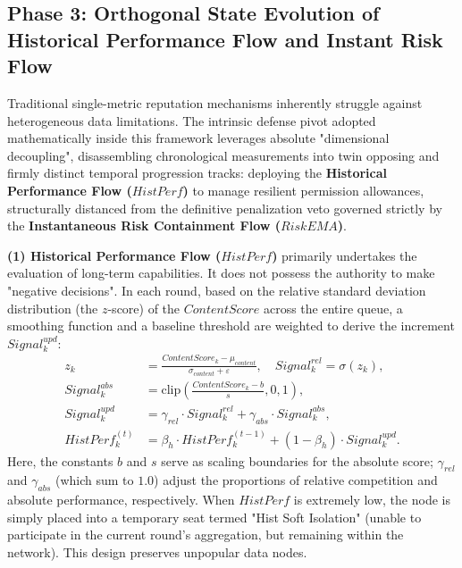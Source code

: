 \documentclass[runningheads]{llncs}
\begin{document}
\subsection{Phase 3: Orthogonal State Evolution of Historical Performance Flow and Instant Risk Flow}
Traditional single-metric reputation mechanisms inherently struggle against heterogeneous data limitations. The intrinsic defense pivot adopted mathematically inside this framework leverages absolute "dimensional decoupling", disassembling chronological measurements into twin opposing and firmly distinct temporal progression tracks: deploying the \textbf{Historical Performance Flow ($HistPerf$)} to manage resilient permission allowances, structurally distanced from the definitive penalization veto governed strictly by the \textbf{Instantaneous Risk Containment Flow ($RiskEMA$)}.

\textbf{(1) Historical Performance Flow ($HistPerf$)} primarily undertakes the evaluation of long-term capabilities. It does not possess the authority to make "negative decisions". In each round, based on the relative standard deviation distribution (the $z$-score) of the $ContentScore$ across the entire queue, a smoothing function and a baseline threshold are weighted to derive the increment $Signal_k^{upd}$:
\begin{align}
    z_{k} &= \frac{ContentScore_{k} - \mu_{content}}{\sigma_{content} + \varepsilon}, \quad Signal_{k}^{rel} = \sigma(z_{k}), \\
    Signal_{k}^{abs} &= \mathrm{clip}\left(\frac{ContentScore_{k} - b}{s}, 0, 1\right), \\
    Signal_{k}^{upd} &= \gamma_{rel} \cdot Signal_{k}^{rel} + \gamma_{abs} \cdot Signal_{k}^{abs}, \\
    HistPerf_{k}^{(t)} &= \beta_{h} \cdot HistPerf_{k}^{(t-1)} + (1 - \beta_{h}) \cdot Signal_{k}^{upd}.
\end{align}
Here, the constants $b$ and $s$ serve as scaling boundaries for the absolute score; $\gamma_{rel}$ and $\gamma_{abs}$ (which sum to $1.0$) adjust the proportions of relative competition and absolute performance, respectively. When $HistPerf$ is extremely low, the node is simply placed into a temporary seat termed "Hist Soft Isolation" (unable to participate in the current round's aggregation, but remaining within the network). This design preserves unpopular data nodes.
\end{document}

